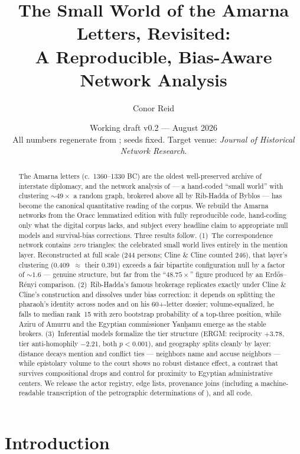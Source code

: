 \documentclass[11pt]{article}
\title{\LARGE The Small World of the Amarna Letters, Revisited:\\
\Large A Reproducible, Bias-Aware Network Analysis}
\author{Conor Reid}
\date{Working draft v0.2 --- August 2026\\
\small All numbers regenerate from \project{run\_all.sh}; seeds fixed.
Target venue: \emph{Journal of Historical Network Research}.}
\begin{document}
\maketitle

\begin{abstract}
\noindent The Amarna letters (c.~1360--1330 BC) are the oldest
well-preserved archive of interstate diplomacy, and the network analysis
of \citet{ClineCline2015} --- a hand-coded ``small world'' with
clustering ${\sim}49\times$ a random graph, brokered above all by
Rib-Hadda of Byblos --- has become the canonical quantitative reading of
the corpus. We rebuild the Amarna networks from the Oracc lemmatized
edition with fully reproducible code, hand-coding only what the digital
corpus lacks, and subject every headline claim to appropriate null models
and survival-bias corrections. Three results follow. (1)~The
correspondence network contains \emph{zero} triangles: the celebrated
small world lives entirely in the mention layer. Reconstructed at full
scale (244 persons; Cline \& Cline counted 246), that layer's clustering
(0.409~$\approx$ their 0.391) exceeds a fair bipartite configuration null
by a factor of ${\sim}1.6$ --- genuine structure, but far from the
``$48.75\times$'' figure produced by an Erdős--Rényi comparison.
(2)~Rib-Hadda's famous brokerage replicates exactly under Cline \&
Cline's construction and dissolves under bias correction: it depends on
splitting the pharaoh's identity across nodes and on his 60+-letter
dossier; volume-equalized, he falls to median rank~15 with zero bootstrap
probability of a top-three position, while Aziru of Amurru and the
Egyptian commissioner Yanḫamu emerge as the stable brokers.
(3)~Inferential models formalize the tier structure (ERGM: reciprocity
$+3.78$, tier anti-homophily $-2.21$, both $p<0.001$), and geography
splits cleanly by layer: distance decays mention and conflict ties ---
neighbors name and accuse neighbors --- while epistolary volume to the
court shows no robust distance effect, a contrast that survives
compositional drops and control for proximity to Egyptian administrative
centers. We release the actor
registry, edge lists, provenance joins (including a machine-readable
transcription of the petrographic determinations of
\citealp{Goren2004}), and all code.
\end{abstract}

\section{Introduction}
\end{document}
